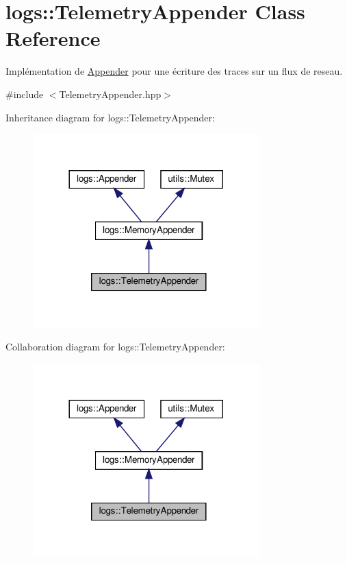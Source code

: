 \hypertarget{classlogs_1_1TelemetryAppender}{}\section{logs\+:\+:Telemetry\+Appender Class Reference}
\label{classlogs_1_1TelemetryAppender}


Implémentation de \hyperlink{classlogs_1_1Appender}{Appender} pour une écriture des traces sur un flux de reseau.  




{\ttfamily \#include $<$Telemetry\+Appender.\+hpp$>$}



Inheritance diagram for logs\+:\+:Telemetry\+Appender\+:
\nopagebreak
\begin{figure}[H]
\begin{center}
\leavevmode
\includegraphics[width=248pt]{classlogs_1_1TelemetryAppender__inherit__graph}
\end{center}
\end{figure}


Collaboration diagram for logs\+:\+:Telemetry\+Appender\+:
\nopagebreak
\begin{figure}[H]
\begin{center}
\leavevmode
\includegraphics[width=248pt]{classlogs_1_1TelemetryAppender__coll__graph}
\end{center}
\end{figure}
